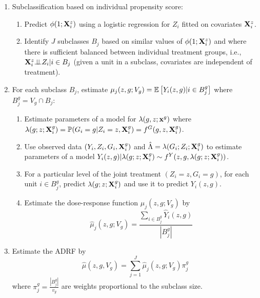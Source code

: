 \documentclass[10pt]{article}
\begin{document}
\begin{enumerate}

\item
Subclassification based on individual propensity score:
\begin{enumerate}
\item
Predict $\phi(1;\mathbf{X}_i^z)$ using a logistic regression for $Z_i$ fitted on covariates $\mathbf{X}_i^z$.
\item
Identify $J$ subclasses $B_j$ based on similar values of $\phi(1;\mathbf{X}_i^z)$ and where there is sufficient balanced between individual treatment groups, i.e., $\mathbf{X}_i^z{\perp\!\!\!\perp} Z_i|i\in B_j$ (given a unit in a subclass, covariates are independent of treatment).
\end{enumerate}

\item
For each subclass $B_j$, estimate $\mu_j(z,g;V_g) = \mathbb{E}\left[Y_i(z,g)|i\in B_j^g\right]$ where $B_j^g= V_g\cap B_j$:
\begin{enumerate}
\item
Estimate parameters of a model for $\lambda(g,z;\mathbf{x}^g)$ where $\lambda(g;z;\mathbf{X}_i^g) = \mathbb{P}(G_i=g|Z_i=z,\mathbf{X}_i^g) = f^G(g,z,\mathbf{X}_i^g)$.
\item
Use observed data $(Y_i,Z_i,G_i,\mathbf{X}_i^g)$ and $\hat{\Lambda}=\lambda(G_i;Z_i;\mathbf{X}_i^g)$ to estimate parameters of a model $Y_i(z,g)|\lambda(g;z;\mathbf{X}_i^g) \sim f^Y(z,g,\lambda(g;z;\mathbf{X}_i^g))$.
\item
For a particular level of the joint treatment $(Z_i=z,G_i=g)$, for each unit $i\in B_j^g$, predict $\lambda(g;z;\mathbf{X}_i^g)$ and use it to predict $Y_i(z,g)$.
\item
Estimate the dose-response function $\mu_j(z,g;V_g)$ by
\[
\hat{\mu}_j(z,g;V_g) = \frac{\sum_{i\in B_j^g}\hat{Y}_i(z,g)}{|B_j^g|}
\]
\end{enumerate}

\item
Estimate the ADRF by
\[
\hat{\mu}(z,g,V_g) = \sum_{j=1}^J\hat{\mu}_j(z,g;V_g)\pi_j^g
\]
where $\pi_j^g=\frac{|B_j^g|}{v_g}$ are weights proportional to the subclass size.

\end{enumerate}


\newpage

\printbibliography
\end{document}
